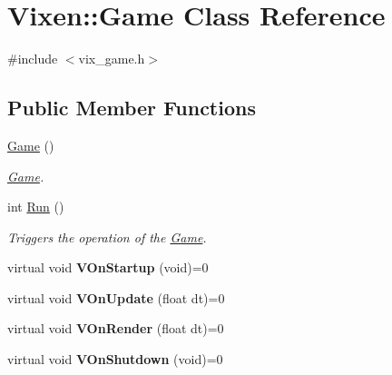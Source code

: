 \hypertarget{class_vixen_1_1_game}{}\section{Vixen\+:\+:Game Class Reference}
\label{class_vixen_1_1_game}


{\ttfamily \#include $<$vix\+\_\+game.\+h$>$}

\subsection*{Public Member Functions}
\begin{DoxyCompactItemize}
\item 
\hypertarget{class_vixen_1_1_game_a338ac9e9277edd96668fc39bc9ba1b21}{}\hyperlink{class_vixen_1_1_game_a338ac9e9277edd96668fc39bc9ba1b21}{Game} ()\label{class_vixen_1_1_game_a338ac9e9277edd96668fc39bc9ba1b21}

\begin{DoxyCompactList}\small\item\em \hyperlink{class_vixen_1_1_game}{Game}. \end{DoxyCompactList}\item 
\hypertarget{class_vixen_1_1_game_aa2079284187ee31746b529a3f85efa5a}{}int \hyperlink{class_vixen_1_1_game_aa2079284187ee31746b529a3f85efa5a}{Run} ()\label{class_vixen_1_1_game_aa2079284187ee31746b529a3f85efa5a}

\begin{DoxyCompactList}\small\item\em Triggers the operation of the \hyperlink{class_vixen_1_1_game}{Game}. \end{DoxyCompactList}\item 
\hypertarget{class_vixen_1_1_game_a92f34dd46ae2ce8cee0bb5c618372e9d}{}virtual void {\bfseries V\+On\+Startup} (void)=0\label{class_vixen_1_1_game_a92f34dd46ae2ce8cee0bb5c618372e9d}

\item 
\hypertarget{class_vixen_1_1_game_a3d36cc170600c181c3d6cef0d2eb87e8}{}virtual void {\bfseries V\+On\+Update} (float dt)=0\label{class_vixen_1_1_game_a3d36cc170600c181c3d6cef0d2eb87e8}

\item 
\hypertarget{class_vixen_1_1_game_a0c405038f67206aaf1ac5358912c4aa2}{}virtual void {\bfseries V\+On\+Render} (float dt)=0\label{class_vixen_1_1_game_a0c405038f67206aaf1ac5358912c4aa2}

\item 
\hypertarget{class_vixen_1_1_game_af56394bc5d03009f05c1689ec80f7cbf}{}virtual void {\bfseries V\+On\+Shutdown} (void)=0\label{class_vixen_1_1_game_af56394bc5d03009f05c1689ec80f7cbf}


\end{DoxyCompactItemize}
